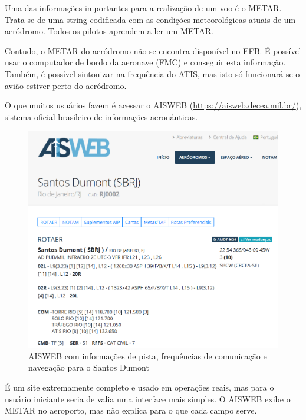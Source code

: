 Uma das informações importantes para a realização de um voo é o METAR. Trata-se 
de uma string codificada com as condições meteorológicas atuais de um aeródromo. 
Todos os pilotos aprendem a ler um METAR.

Contudo, o METAR do aeródromo não se encontra disponível no EFB. É possível usar
 o computador de bordo da aeronave (FMC) e conseguir esta informação. Também, é 
 possível sintonizar na frequência do ATIS, mas isto só funcionará se o avião
 estiver perto do aeródromo.

O que muitos usuários fazem é acessar o AISWEB 
(\url{https://aisweb.decea.mil.br/}), sistema oficial brasileiro de informações
aeronáuticas. 

\begin{figure}[ht]
    \begin{center}
    \includegraphics[width=350pt]{img/aisweb.png}
    \caption{AISWEB com informações de pista, frequências de comunicação e navegação para o Santos Dumont}
    \label{fig:aisweb}
    \end{center}
\end{figure}

É um site extremamente completo e usado em operações reais, mas para o usuário 
iniciante seria de valia uma interface mais simples. O AISWEB exibe o METAR no 
aeroporto, mas não explica para o que cada campo serve.

